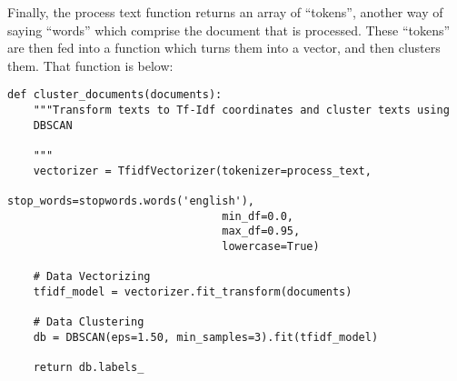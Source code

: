 Finally, the process text function returns an array of ``tokens'',
another way of saying ``words'' which comprise the document that is
processed. These ``tokens'' are then fed into a function which
turns them into a vector, and then clusters them. That function
is below:
  
\begin{lstlisting}
def cluster_documents(documents):
    """Transform texts to Tf-Idf coordinates and cluster texts using
    DBSCAN
    
    """
    vectorizer = TfidfVectorizer(tokenizer=process_text,
                                 stop_words=stopwords.words('english'),
                                 min_df=0.0,
                                 max_df=0.95,
                                 lowercase=True)
    
    # Data Vectorizing
    tfidf_model = vectorizer.fit_transform(documents)
    
    # Data Clustering
    db = DBSCAN(eps=1.50, min_samples=3).fit(tfidf_model)
    
    return db.labels_
\end{lstlisting}



